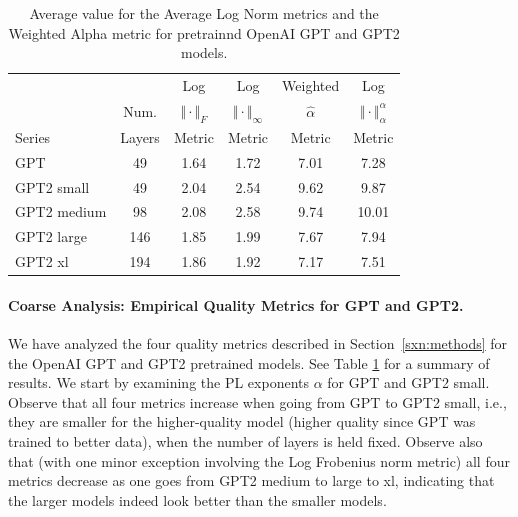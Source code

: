 \begin{table}[t]
\small
\begin{center}
\begin{tabular}{|p{0.75in}|c|c|c|c|c|}
\hline
        &        & Log                   & Log                        & Weighted       & Log                                 \\
        & Num.   & $\Vert\cdot\Vert_{F}$ & $\Vert\cdot\Vert_{\infty}$ & $\hat{\alpha}$ & $\Vert\cdot\Vert^{\alpha}_{\alpha}$ \\
 Series & Layers & Metric                & Metric                     & Metric         & Metric                              \\
\hline
GPT & 49 & 1.64  & 1.72 & 7.01 & 7.28 \\
GPT2 small & 49 & 2.04  & 2.54& 9.62 & 9.87 \\
GPT2 medium & 98 & 2.08 & 2.58& 9.74 & 10.01 \\
GPT2 large & 146 & 1.85 & 1.99& 7.67 & 7.94 \\
GPT2 xl & 194 & 1.86 & 1.92 & 7.17 & 7.51 \\
\hline
\end{tabular}
\end{center}
\caption{Average value for the Average Log Norm metrics and the Weighted Alpha metric for pretrainnd OpenAI GPT and GPT2 models.  }
\label{table:nlp}
\end{table}


\paragraph{Coarse Analysis: Empirical Quality Metrics for GPT and GPT2.}

We have analyzed the four quality metrics described in Section~\ref{sxn:methods} for the OpenAI GPT and GPT2 pretrained models.
See Table \ref{table:nlp} for a summary of results.
We start by examining the PL exponents $\alpha$ for GPT and GPT2 small.
Observe that all four metrics increase when going from GPT to GPT2 small, i.e., they are smaller for the higher-quality model (higher quality since GPT was trained to better data), when the number of layers is held fixed.
Observe also that (with one minor exception involving the Log Frobenius norm metric) all four metrics decrease as one goes from GPT2 medium to large to xl, indicating that the larger models indeed look better than the smaller models.

